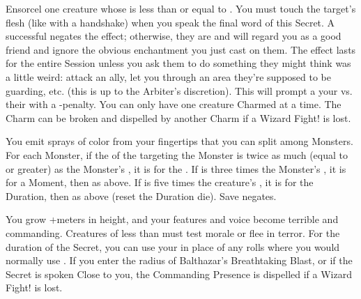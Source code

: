 Ensorcel one creature whose \HD is less than or equal to \DICE. You must touch the target's flesh (like with a handshake) when you speak the final word of this Secret. A successful  negates the effect; otherwise, they are  and will regard you as a good friend and ignore the obvious enchantment you just cast on them.  The effect lasts for the entire Session unless you ask them to do something they might think was a little weird: attack an ally, let you through an area they're supposed to be guarding, etc. (this is up to the Arbiter's discretion).  This will prompt a
\RB your \INT vs. their \FOC with a -\DICE penalty. You can only have one creature Charmed at a time. The Charm can be broken and dispelled by another Charm if a Wizard Fight! is lost. 


\newpage

\WIZARDRY[
  Name=Color Spray,
  Link=secrets-color-spray,
  Alignment=Mind,
  Save=Y (negate),
  Duration=\DICE,
  Counter=None ,
  Keywords=Splittable,
  Target=Close or Nearby Monster(s)
]



You emit \DICE sprays of color from your fingertips that you can split among \DICE Monsters.  For each Monster, if the \SUMDICE of the \DICE targeting the Monster is twice as much (equal to or greater) as the Monster's \HD, it
is  for the \Duration.  If \SUMDICE is three times the Monster's \HD, it is  for a Moment, then  as above. If \SUMDICE is five times the creature's \HD, it is  for the Duration, then  as above (reset the Duration die).  Save negates.





\WIZARDRY[
  Name=Commanding Presence,
  Link=secrets-commanding-presence,
  Alignment=Mind,
  Save=N,
  Duration=Combat or \SUMDICE real-world minutes,
  Counter=\mylink{Balthazar's Breathtaking Blast}{secrets-balthazars-breathtaking-blast} ,
  Keywords=None,
  Target=Self
]

You grow +\DICE meters in height, and your features and voice become terrible and commanding.  Creatures of less than \DICE \HD must test morale or flee in terror. For the duration of the Secret, you can use your \INT in place of any rolls where you would normally use \VIG.  If you enter the radius of Balthazar's Breathtaking Blast, or if the Secret is spoken Close to you, the Commanding Presence is dispelled if a Wizard Fight! is lost.




